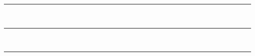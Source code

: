 \documentclass{article}
\begin{document}

\rule{3em}{2em}\\

\hrule width6cm\relax~\\
\hrule\relax~\\

\vrule height1cm depth2pt\relax

\end{document}
